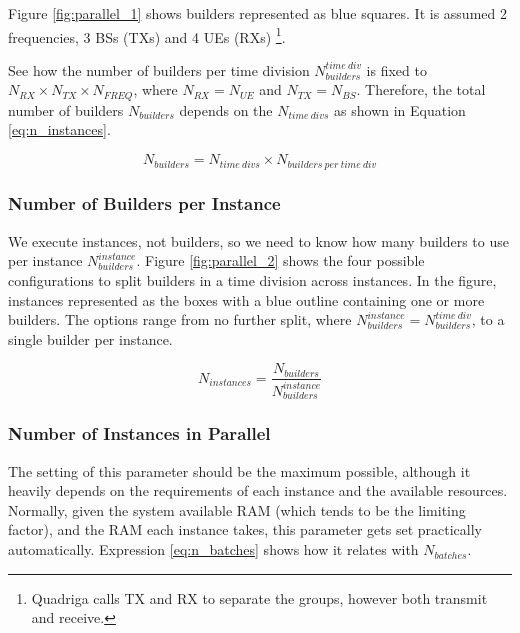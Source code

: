 Figure \ref{fig:parallel_1} shows builders represented as blue squares. It is assumed 2 frequencies, 3 \acsp{BS} (TXs) and 4 \acsp{UE} (RXs) \footnote{Quadriga calls TX and RX to separate the groups, however both transmit and receive.}. 



See how the number of builders per time division $N_{builders}^{time\  div}$ is fixed to $N_{RX} \times N_{TX} \times N_{FREQ}$, where $N_{RX} = N_{UE}$ and $N_{TX} = N_{BS}$. Therefore, the total number of builders $N_{builders}$ depends on the $N_{time \ divs}$ as shown in Equation \eqref{eq:n_instances}. 

\begin{equation} \label{eq:n_instances}
    N_{builders} = N_{time \ divs} \times N_{builders \ per\  time\  div} 
\end{equation}


\subsubsection*{Number of Builders per Instance}

We execute instances, not builders, so we need to know how many builders to use per instance $N_{builders}^{instance}$. Figure \ref{fig:parallel_2} shows the four possible configurations to split builders in a time division across instances. In the figure, instances represented as the boxes with a blue outline containing one or more builders. The options range from no further split, where $N_{builders}^{instance} = N_{builders}^{time\  div}$, to a single builder per instance. 


\begin{equation} \label{eq:n_inst}
    N_{instances} = \frac{N_{builders}}{N_{builders}^{instance}}
\end{equation}


\subsubsection*{Number of Instances in Parallel}

The setting of this parameter should be the maximum possible, although it heavily depends on the requirements of each instance and the available resources. Normally, given the system available RAM (which tends to be the limiting factor), and the RAM each instance takes, this parameter gets set practically automatically. Expression \eqref{eq:n_batches} shows how it relates with $N_{batches}$.


